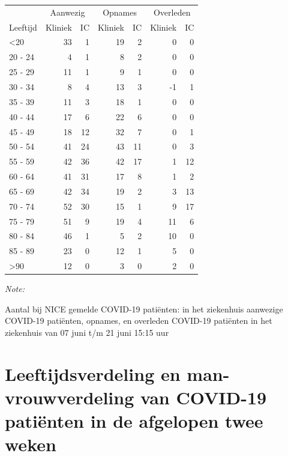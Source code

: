 \documentclass[
  english,
  man,floatsintext]{apa6}
\begin{document}
\begin{table}
\centering\begingroup\fontsize{10}{12}\selectfont

\begin{threeparttable}
\begin{tabular}{lrrrrrr}
\toprule
\multicolumn{1}{c}{ } & \multicolumn{2}{c}{Aanwezig} & \multicolumn{2}{c}{Opnames} & \multicolumn{2}{c}{Overleden} \\
\cmidrule(l{3pt}r{3pt}){2-3} \cmidrule(l{3pt}r{3pt}){4-5} \cmidrule(l{3pt}r{3pt}){6-7}
Leeftijd & Kliniek & IC & Kliniek & IC & Kliniek & IC\\
\midrule
<20 & 33 & 1 & 19 & 2 & 0 & 0\\
20 - 24 & 4 & 1 & 8 & 2 & 0 & 0\\
25 - 29 & 11 & 1 & 9 & 1 & 0 & 0\\
30 - 34 & 8 & 4 & 13 & 3 & -1 & 1\\
35 - 39 & 11 & 3 & 18 & 1 & 0 & 0\\
40 - 44 & 17 & 6 & 22 & 6 & 0 & 0\\
45 - 49 & 18 & 12 & 32 & 7 & 0 & 1\\
50 - 54 & 41 & 24 & 43 & 11 & 0 & 3\\
55 - 59 & 42 & 36 & 42 & 17 & 1 & 12\\
60 - 64 & 41 & 31 & 17 & 8 & 1 & 2\\
65 - 69 & 42 & 34 & 19 & 2 & 3 & 13\\
70 - 74 & 52 & 30 & 15 & 1 & 9 & 17\\
75 - 79 & 51 & 9 & 19 & 4 & 11 & 6\\
80 - 84 & 46 & 1 & 5 & 2 & 10 & 0\\
85 - 89 & 23 & 0 & 12 & 1 & 5 & 0\\
>90 & 12 & 0 & 3 & 0 & 2 & 0\\
\bottomrule
\end{tabular}
\begin{tablenotes}
\item \textit{Note: } 
\item Aantal bij NICE gemelde COVID-19 patiënten: in het ziekenhuis aanwezige COVID-19 patiënten, opnames, en overleden COVID-19 patiënten in het ziekenhuis van 07 juni t/m 21 juni 15:15 uur
\end{tablenotes}
\end{threeparttable}
\endgroup{}
\end{table}

\newpage

\hypertarget{leeftijdsverdeling-en-man-vrouwverdeling-van-covid-19-patiuxebnten-in-de-afgelopen-twee-weken}{%
\section{Leeftijdsverdeling en man-vrouwverdeling van COVID-19 patiënten in de afgelopen twee weken}\label{leeftijdsverdeling-en-man-vrouwverdeling-van-covid-19-patiuxebnten-in-de-afgelopen-twee-weken}}
\end{document}

